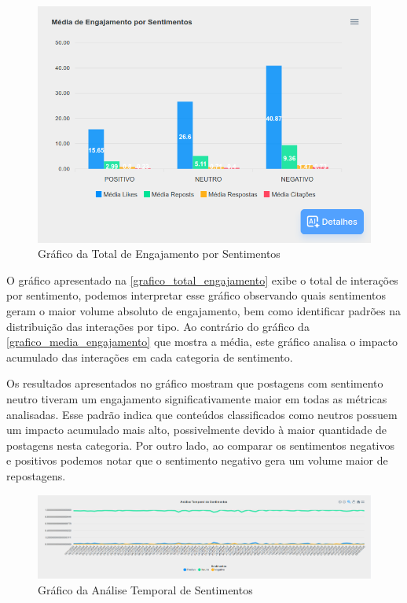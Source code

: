 \documentclass[
	12pt,				%
	oneside,			%
	a4paper,			%
	english,			%
	french,				%
	spanish,			%
	brazil				%
	]{abntex2}
\begin{document}
\begin{figure}[htbp]
\hypertarget{grafico_total_engajamento}{%
\caption{Gráfico da Total de Engajamento por Sentimentos}\label{grafico_total_engajamento}
\begin{center}
\includegraphics[scale=0.3]{imagens/sentilytics/estudo-caso/media_engajamento_por_sentimento.png}
\end{center}
}
\end{figure}

O gráfico apresentado na \autoref{grafico_total_engajamento} exibe o
total de interações por sentimento, podemos interpretar esse gráfico
observando quais sentimentos geram o maior volume absoluto de
engajamento, bem como identificar padrões na distribuição das interações
por tipo. Ao contrário do gráfico da \autoref{grafico_media_engajamento}
que mostra a média, este gráfico analisa o impacto acumulado das
interações em cada categoria de sentimento.

Os resultados apresentados no gráfico mostram que postagens com
sentimento neutro tiveram um engajamento significativamente maior em
todas as métricas analisadas. Esse padrão indica que conteúdos
classificados como neutros possuem um impacto acumulado mais alto,
possivelmente devido à maior quantidade de postagens nesta categoria.
Por outro lado, ao comparar os sentimentos negativos e positivos podemos
notar que o sentimento negativo gera um volume maior de repostagens.

\begin{figure}[htbp]
\hypertarget{grafico_analise_temporal}{%
\caption{Gráfico da Análise Temporal de Sentimentos}\label{grafico_analise_temporal}
\begin{center}
\includegraphics[scale=0.26]{imagens/sentilytics/estudo-caso/analise_temporal_sentimentos.png}
\end{center}
}
\end{figure}
\end{document}
